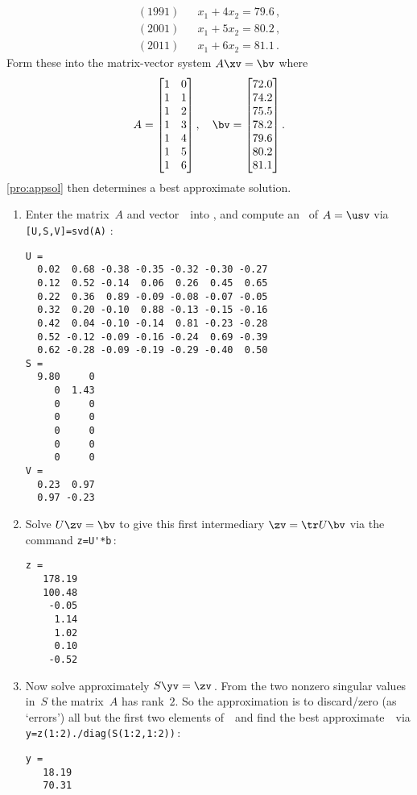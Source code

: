 \begin{example}
\begin{solution}
\begin{eqnarray*}
\\(1991)&&x_1+4x_2=79.6\,,
\\(2001)&&x_1+5x_2=80.2\,,
\\(2011)&&x_1+6x_2=81.1\,.
\end{eqnarray*}
Form these into the matrix-vector system \(A\xv=\bv\) where
\begin{equation*}
A= \begin{bmatrix} 1&0\\1&1\\1&2\\1&3\\1&4\\1&5\\1&6 \end{bmatrix},
\quad \bv=\begin{bmatrix}72.0\\74.2\\75.5\\78.2\\79.6\\80.2\\81.1\end{bmatrix}.
\end{equation*}
\autoref{pro:appsol} then determines a best approximate solution.
\begin{enumerate}
\item Enter the matrix~\(A\) and vector~\bv\ into \script, and compute an \svd\ of \(A=\usv\) via \verb|[U,S,V]=svd(A)| \twodp:
\setbox\ajrqrbox\hbox{}%
\marginajrbox%
\begin{verbatim}
U =
  0.02  0.68 -0.38 -0.35 -0.32 -0.30 -0.27
  0.12  0.52 -0.14  0.06  0.26  0.45  0.65
  0.22  0.36  0.89 -0.09 -0.08 -0.07 -0.05
  0.32  0.20 -0.10  0.88 -0.13 -0.15 -0.16
  0.42  0.04 -0.10 -0.14  0.81 -0.23 -0.28
  0.52 -0.12 -0.09 -0.16 -0.24  0.69 -0.39
  0.62 -0.28 -0.09 -0.19 -0.29 -0.40  0.50
S =
  9.80     0
     0  1.43
     0     0
     0     0
     0     0
     0     0
     0     0
V =
  0.23  0.97
  0.97 -0.23
\end{verbatim}
\item Solve \(U\zv=\bv\) to give this first intermediary \(\zv=\tr U\bv\) via the command \verb|z=U'*b|\,:
\begin{verbatim}
z =
   178.19
   100.48
    -0.05
     1.14
     1.02
     0.10
    -0.52
\end{verbatim}

\item Now solve approximately \(S\yv=\zv\)\,. 
From the two nonzero singular values in~\(S\) the matrix~\(A\) has rank~\(2\).
So the approximation is to discard\slash zero (as `errors') all but the first two elements of~\zv\ and find the best approximate~\yv\ via \verb|y=z(1:2)./diag(S(1:2,1:2))|\,:
\begin{verbatim}
y =
   18.19
   70.31
\end{verbatim}


\end{enumerate}
\end{solution}
\end{example}
